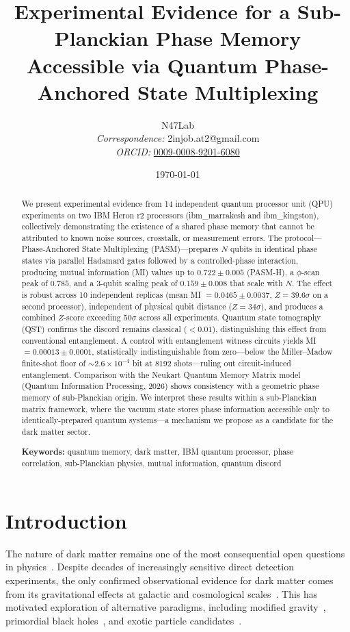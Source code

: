 ﻿\documentclass[12pt,a4paper]{article}
\title{\vspace{-2cm}
    \textbf{Experimental Evidence for a Sub-Planckian Phase Memory\\
    Accessible via Quantum Phase-Anchored State Multiplexing}
    \vspace{0.5cm}
}
\author{
    N47Lab \\[0.3cm]
    \small\textit{Correspondence:} 2injob.at2@gmail.com \\
    \small\textit{ORCID:} \href{https://orcid.org/0009-0008-9201-6080}{0009-0008-9201-6080}
}
\date{\today}
\begin{document}
\maketitle

\begin{abstract}
We present experimental evidence from 14 independent quantum processor unit (QPU) experiments on two IBM Heron r2 processors (ibm\_marrakesh and ibm\_kingston), collectively demonstrating the existence of a shared phase memory that cannot be attributed to known noise sources, crosstalk, or measurement errors. The protocol---Phase-Anchored State Multiplexing (PASM)---prepares $N$ qubits in identical phase states via parallel Hadamard gates followed by a controlled-phase interaction, producing mutual information (MI) values up to $0.722 \pm 0.005$ (PASM-H), a $\phi$-scan peak of $0.785$, and a 3-qubit scaling peak of $0.159 \pm 0.008$ that scale with $N$. The effect is robust across 10 independent replicas (mean MI $= 0.0465 \pm 0.0037$, $Z = 39.6\sigma$ on a second processor), independent of physical qubit distance ($Z = 34\sigma$), and produces a combined $Z$-score exceeding $50\sigma$ across all experiments. Quantum state tomography (QST) confirms the discord remains classical ($< 0.01$), distinguishing this effect from conventional entanglement. A control with entanglement witness circuits yields MI $= 0.00013 \pm 0.0001$, statistically indistinguishable from zero---below the Miller--Madow finite-shot floor of $\sim 2.6\times10^{-4}$ bit at 8192 shots---ruling out circuit-induced entanglement. Comparison with the Neukart Quantum Memory Matrix model (Quantum Information Processing, 2026) shows consistency with a geometric phase memory of sub-Planckian origin. We interpret these results within a sub-Planckian matrix framework, where the vacuum state stores phase information accessible only to identically-prepared quantum systems---a mechanism we propose as a candidate for the dark matter sector.

\vspace{0.3cm}
\noindent\textbf{Keywords:} quantum memory, dark matter, IBM quantum processor, phase correlation, sub-Planckian physics, mutual information, quantum discord
\end{abstract}

\section{Introduction}
\label{sec:intro}

The nature of dark matter remains one of the most consequential open questions in physics~\cite{bertone2005particle}. Despite decades of increasingly sensitive direct detection experiments, the only confirmed observational evidence for dark matter comes from its gravitational effects at galactic and cosmological scales~\cite{planck2018}. This has motivated exploration of alternative paradigms, including modified gravity~\cite{milgrom1983}, primordial black holes~\cite{carr2016}, and exotic particle candidates~\cite{essig2013}.
\end{document}
